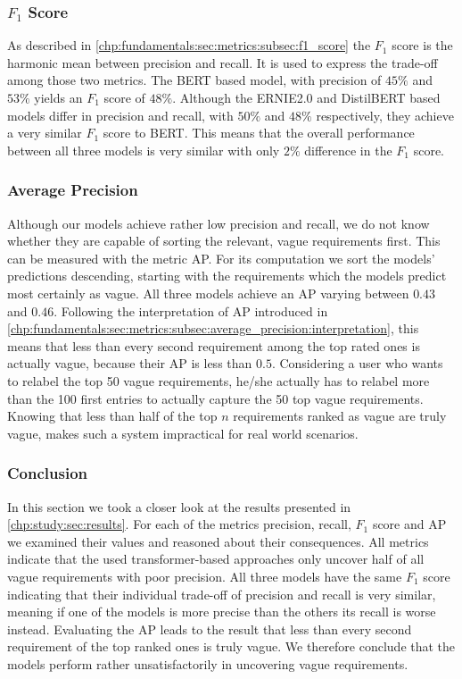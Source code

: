 \subsubsection{$F_1$ Score}
\label{chp:study:sec:interpretation:subsec:discussion:f1_score}
As described in \cref{chp:fundamentals:sec:metrics:subsec:f1_score} the $F_1$ score is the harmonic mean between precision and recall.
It is used to express the trade-off among those two metrics.
The \ac{BERT} based model, with precision of $45\%$ and $53\%$ yields an $F_1$ score of $48\%$.
Although the \ac{ERNIE2.0} and \ac{DistilBERT} based models differ in precision and recall, with $50\%$ and $48\%$ respectively, they achieve a very similar $F_1$ score to \ac{BERT}.
This means that the overall performance between all three models is very similar with only $2\%$ difference in the $F_1$ score.

\subsubsection{Average Precision}
\label{chp:study:sec:interpretation:subsec:discussion:average_precision}
Although our models achieve rather low precision and recall, we do not know whether they are capable of sorting the relevant, vague requirements first.
This can be measured with the metric \ac{AP}.
For its computation we sort the models' predictions descending, starting with the requirements which the models predict most certainly as vague.
All three models achieve an \ac{AP} varying between $0.43$ and $0.46$.
Following the interpretation of \ac{AP} introduced in \cref{chp:fundamentals:sec:metrics:subsec:average_precision:interpretation}, this means that less than every second requirement among the top rated ones is actually vague, because their \ac{AP} is less than $0.5$.
Considering a user who wants to relabel the top 50 vague requirements, he/she actually has to relabel more than the 100 first entries to actually capture the 50 top vague requirements.
Knowing that less than half of the top $n$ requirements ranked as vague are truly vague, makes such a system impractical for real world scenarios.

\subsubsection{Conclusion}
\label{chp:study:sec:interpretation:subsec:discussion:usability}
In this section we took a closer look at the results presented in \cref{chp:study:sec:results}.
For each of the metrics precision, recall, $F_1$ score and \ac{AP} we examined their values and reasoned about their consequences.
All metrics indicate that the used transformer-based approaches only uncover half of all vague requirements with poor precision.
All three models have the same $F_1$ score indicating that their individual trade-off of precision and recall is very similar, meaning if one of the models is more precise than the others its recall is worse instead.
Evaluating the \ac{AP} leads to the result that less than every second requirement of the top ranked ones is truly vague.
We therefore conclude that the models perform rather unsatisfactorily in uncovering vague requirements.
